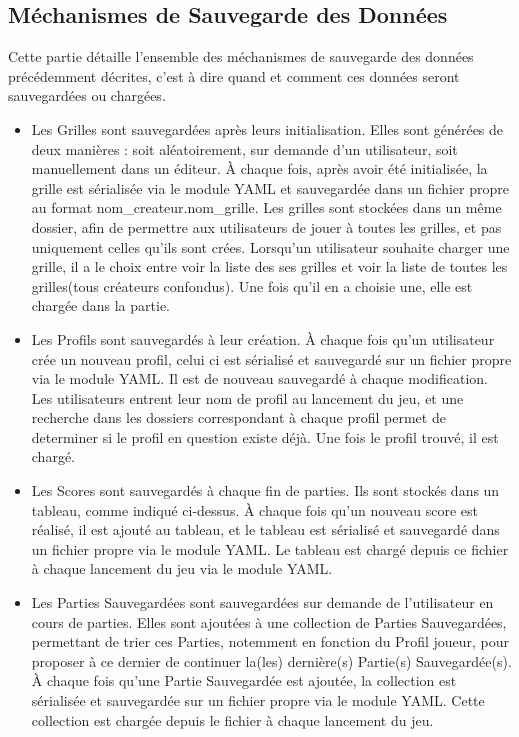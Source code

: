 \documentclass[11pt]{article}
\begin{document}
\subsection{Méchanismes de Sauvegarde des Données}
Cette partie détaille l'ensemble des méchanismes de sauvegarde des données précédemment décrites, c'est à dire quand et comment ces données seront sauvegardées ou chargées.

\begin{itemize}
    \item Les Grilles sont sauvegardées après leurs initialisation. Elles sont générées de deux manières : soit aléatoirement, sur demande d'un utilisateur, soit manuellement dans un éditeur. À chaque fois, après avoir été initialisée, la grille est sérialisée via le module YAML et sauvegardée dans un fichier propre au format nom_createur.nom_grille. Les grilles sont stockées dans un même dossier, afin de permettre aux utilisateurs de jouer à toutes les grilles, et pas uniquement celles qu'ils sont crées. Lorsqu'un utilisateur souhaite charger une grille, il a le choix entre voir la liste des ses grilles et voir la liste de toutes les grilles(tous créateurs confondus). Une fois qu'il en a choisie une, elle est chargée dans la partie.
    \item Les Profils sont sauvegardés à leur création. À chaque fois qu'un utilisateur crée un nouveau profil, celui ci est sérialisé et sauvegardé sur un fichier propre via le module YAML. Il est de nouveau sauvegardé à chaque modification. Les utilisateurs entrent leur nom de profil au lancement du jeu, et une recherche dans les dossiers correspondant à chaque profil permet de determiner si le profil en question existe déjà. Une fois le profil trouvé, il est chargé.
    \item Les Scores sont sauvegardés à chaque fin de parties. Ils sont stockés dans un tableau, comme indiqué ci-dessus. À chaque fois qu'un nouveau score est réalisé, il est ajouté au tableau, et le tableau est sérialisé et sauvegardé dans un fichier propre via le module YAML. Le tableau est chargé depuis ce fichier à chaque lancement du jeu via le module YAML.
    \item Les Parties Sauvegardées sont sauvegardées sur demande de l'utilisateur en cours de parties. Elles sont ajoutées à une collection de Parties Sauvegardées, permettant de trier ces Parties, notemment en fonction du Profil joueur, pour proposer à ce dernier de continuer la(les) dernière(s) Partie(s) Sauvegardée(s). À chaque fois qu'une Partie Sauvegardée est ajoutée, la collection est sérialisée et sauvegardée sur un fichier propre via le module YAML. Cette collection est chargée depuis le fichier à chaque lancement du jeu.
\end{itemize}
\end{document}
